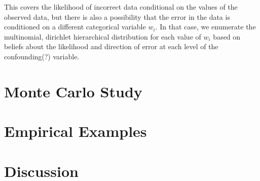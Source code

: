 \documentclass[fignum,letterpaper,12pt]{article}
\begin{document}
This covers the likelihood of incorrect data conditional on the values of the observed data, but there is also a possibility that the error in the data is conditioned on a different categorical variable $w_i$. In that case, we enumerate the multinomial, dirichlet hierarchical distribution for each value of $w_i$ based on beliefs about the likelihood and direction of error at each level of the confounding(?) variable.



\section{Monte Carlo Study} \label{sec:montecarlo}



\section{Empirical Examples} \label{sec:examples}



\section{Discussion} \label{sec:conclusion}



\clearpage
\singlespacing
{}

\end{document}
